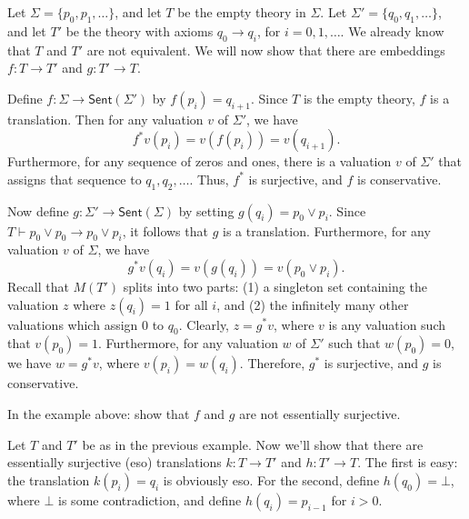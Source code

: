 \begin{example} Let $\Sigma = \{ p_0,p_1,\dots \}$, and let $T$ be the
  empty theory in $\Sigma$.  Let $\Sigma '=\{ q_0,q_1,\dots \}$, and
  let $T'$ be the theory with axioms $q_0\to q_i$, for $i=0,1,\dots$.
  We already know that $T$ and $T'$ are not equivalent.  We will now
  show that there are embeddings $f:T\to T'$ and $g:T'\to T$.

  Define $f:\Sigma\to \mathsf{Sent}(\Sigma ')$ by $f(p_i)=q_{i+1}$.
  Since $T$ is the empty theory, $f$ is a translation.  Then for any
  valuation $v$ of $\Sigma '$, we have \[
  f^*v(p_i)=v(f(p_i))=v(q_{i+1}) .\] Furthermore, for any sequence of
  zeros and ones, there is a valuation $v$ of $\Sigma '$ that assigns
  that sequence to $q_1,q_2,\dots $.  Thus, $f^*$ is surjective, and
  $f$ is conservative.

  Now define $g:\Sigma '\to\mathsf{Sent}(\Sigma )$ by setting
  $g(q_i)=p_0\vee p_i$.  Since $T\vdash p_0\vee p_0\to p_0\vee p_i$,
  it follows that $g$ is a translation.  Furthermore, for any
  valuation $v$ of $\Sigma$, we have
  \[ g^*v(q_i) = v(g(q_i)) = v(p_0\vee p_i) .\] Recall that $M(T')$
  splits into two parts: (1) a singleton set containing the valuation
  $z$ where $z(q_i)=1$ for all $i$, and (2) the infinitely many other
  valuations which assign $0$ to $q_0$.  Clearly, $z=g^*v$, where $v$
  is any valuation such that $v(p_0)=1$.  Furthermore, for any
  valuation $w$ of $\Sigma '$ such that $w(p_0)=0$, we have $w=g^*v$,
  where $v(p_i)=w(q_i)$.  Therefore, $g^*$ is surjective, and $g$ is
  conservative.
\end{example}

\begin{exercise} In the example above: show that $f$ and $g$ are not
  essentially surjective.  \end{exercise}

\begin{example} Let $T$ and $T'$ be as in the previous example.  Now
  we'll show that there are essentially surjective (eso) translations
  $k:T\to T'$ and $h:T'\to T$.  The first is easy: the translation
  $k(p_i)=q_i$ is obviously eso.  For the second, define
  $h(q_0)=\bot$, where $\bot$ is some contradiction, and define
  $h(q_i)=p_{i-1}$ for $i>0$.  \end{example}

